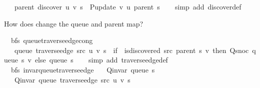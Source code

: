 \begin{isabellebody}
\ \ \ {\isachardoublequoteopen}parent\ {\isacharparenleft}{\kern0pt}discover\ u\ v\ s{\isacharparenright}{\kern0pt}\ {\isacharequal}{\kern0pt}\ P{\isacharunderscore}{\kern0pt}update\ v\ u\ {\isacharparenleft}{\kern0pt}parent\ s{\isacharparenright}{\kern0pt}{\isachardoublequoteclose}\isanewline
%
\isadelimproof
\ \ %
\endisadelimproof
%
\isatagproof
{}\isamarkupfalse%
\ {\isacharparenleft}{\kern0pt}simp\ add{\isacharcolon}{\kern0pt}\ discover{\isacharunderscore}{\kern0pt}def{\isacharparenright}{\kern0pt}%
\endisatagproof
{\isafoldproof}%
%
\isadelimproof
%
\endisadelimproof
%
\begin{isamarkuptext}%
How does  change the queue and parent map?%
\end{isamarkuptext}\isamarkuptrue%
\isamarkupfalse%
\ {\isacharparenleft}{\kern0pt}\ bfs{\isacharparenright}{\kern0pt}\ queue{\isacharunderscore}{\kern0pt}traverse{\isacharunderscore}{\kern0pt}edge{\isacharunderscore}{\kern0pt}cong{\isacharcolon}{\kern0pt}\isanewline
\ \ \ {\isachardoublequoteopen}queue\ {\isacharparenleft}{\kern0pt}traverse{\isacharunderscore}{\kern0pt}edge\ src\ u\ v\ s{\isacharparenright}{\kern0pt}\ {\isacharequal}{\kern0pt}\ {\isacharparenleft}{\kern0pt}if\ {\isasymnot}\ is{\isacharunderscore}{\kern0pt}discovered\ src\ {\isacharparenleft}{\kern0pt}parent\ s{\isacharparenright}{\kern0pt}\ v\ then\ Q{\isacharunderscore}{\kern0pt}snoc\ {\isacharparenleft}{\kern0pt}queue\ s{\isacharparenright}{\kern0pt}\ v\ else\ queue\ s{\isacharparenright}{\kern0pt}{\isachardoublequoteclose}\isanewline
%
\isadelimproof
\ \ %
\endisadelimproof
%
\isatagproof
{}\isamarkupfalse%
\ {\isacharparenleft}{\kern0pt}simp\ add{\isacharcolon}{\kern0pt}\ traverse{\isacharunderscore}{\kern0pt}edge{\isacharunderscore}{\kern0pt}def{\isacharparenright}{\kern0pt}%
\endisatagproof
{\isafoldproof}%
%
\isadelimproof
\isanewline
%
\endisadelimproof
\isanewline
{}\isamarkupfalse%
\ {\isacharparenleft}{\kern0pt}\ bfs{\isacharparenright}{\kern0pt}\ invar{\isacharunderscore}{\kern0pt}queue{\isacharunderscore}{\kern0pt}traverse{\isacharunderscore}{\kern0pt}edge{\isacharcolon}{\kern0pt}\isanewline
\ \ \ {\isachardoublequoteopen}Q{\isacharunderscore}{\kern0pt}invar\ {\isacharparenleft}{\kern0pt}queue\ s{\isacharparenright}{\kern0pt}{\isachardoublequoteclose}\isanewline
\ \ \ {\isachardoublequoteopen}Q{\isacharunderscore}{\kern0pt}invar\ {\isacharparenleft}{\kern0pt}queue\ {\isacharparenleft}{\kern0pt}traverse{\isacharunderscore}{\kern0pt}edge\ src\ u\ v\ s{\isacharparenright}{\kern0pt}{\isacharparenright}{\kern0pt}{\isachardoublequoteclose}\isanewline

\end{isabellebody}
